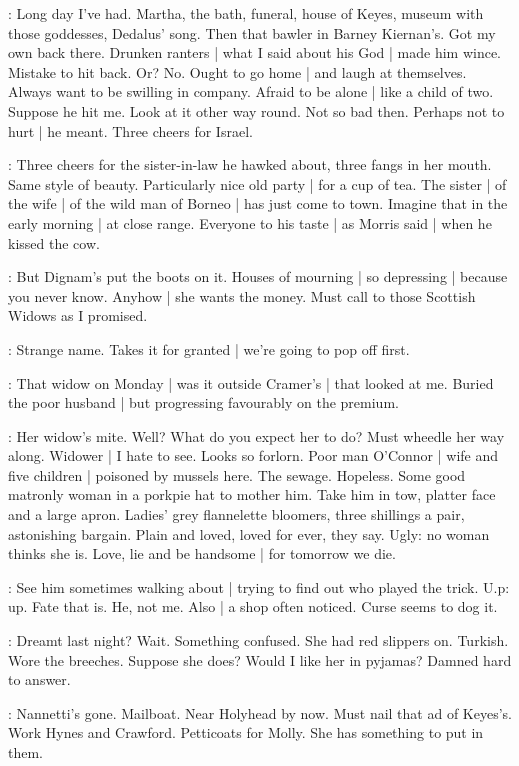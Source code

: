 \BloomToday:
Long day I've had.
Martha,
the bath,
funeral,
house of Keyes,
museum with those goddesses,
Dedalus' song.
Then that bawler in Barney Kiernan's.
Got my own back there.
Drunken ranters |
what I said about his God |
made him wince.
Mistake to hit back.
Or?
No.
Ought to go home |
and laugh at themselves.
Always want to be swilling in company.
Afraid to be alone |
like a child of two.
Suppose he hit me.
Look at it other way round.
Not so bad then.
Perhaps not to hurt |
he meant.%
Three cheers for Israel.

\BloomAbstract:
Three cheers for the sister-in-law he hawked about,
three fangs in her mouth.
Same style of beauty.
Particularly nice old party |
for a cup of tea.
The sister |
of the wife |
of the wild man of Borneo |
has just come to town.
Imagine that in the early morning |
at close range.
Everyone to his taste |
as Morris said |
when he kissed the cow.

\BloomToday:
But Dignam's put the boots on it.
Houses of mourning |
so depressing |
because you never know.
Anyhow |
she wants the money.
Must call to those Scottish Widows
as I promised.

\BloomAbstract:
Strange name.
Takes it for granted |
we're going to pop off first.

\BloomHist:
That widow on Monday |
was it outside Cramer's |
that looked at me.
Buried the poor husband |
but progressing favourably on the premium.%

\BloomAbstract:
Her widow's mite.
Well?
What do you expect her to do?
Must wheedle her way along.
Widower |
I hate to see.
Looks so forlorn.
Poor man O'Connor |
wife and five children |
poisoned by mussels here.
The sewage.
Hopeless.
Some good matronly woman in a porkpie hat to mother him.
Take him in tow,
platter face and a large apron.
Ladies' grey flannelette bloomers,
three shillings a pair,
astonishing bargain.
Plain and loved,
loved for ever,
they say.
Ugly:
no woman thinks she is.
Love,
lie
and be handsome |
for tomorrow we die.

\BloomToday:
See him sometimes walking about |
trying to find out who played the trick.
U.p:
up.
Fate that is.
He,
not me.
Also |
a shop often noticed.
Curse seems to dog it.

\BloomHist:
Dreamt last night?
Wait.%
Something confused.
She had red slippers on.
Turkish.
Wore the breeches.
Suppose she does?
Would I like her in pyjamas?
Damned hard to answer.

\BloomToday:
Nannetti's gone.
Mailboat.
Near Holyhead by now.
Must nail that ad of Keyes's.
Work Hynes and Crawford.
Petticoats for Molly.
She has something to put in them.

